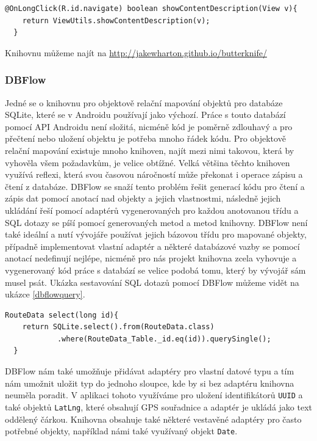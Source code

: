 \documentclass[czech,master,public,dept460,male,java,cpdeclaration]{diploma}
\begin{document}
\begin{lstlisting}[label=butterknife,caption=Použití knihovny Butter Knife]
  @OnLongClick(R.id.navigate) boolean showContentDescription(View v){
    return ViewUtils.showContentDescription(v);
  }

\end{lstlisting}

Knihovnu můžeme najít na \url{http://jakewharton.github.io/butterknife/}

\subsubsection{DBFlow}\label{dbflow}
Jedné se o knihovnu pro objektově relační mapování objektů pro databáze SQLite, které se v
 Androidu používají jako výchozí. Práce s touto databází pomocí API Androidu není
 složitá, nicméně kód je poměrně zdlouhavý a pro přečtení nebo uložení objektu je potřeba
 mnoho řádek kódu. Pro objektově relační mapování existuje mnoho knihoven, najít mezi nimi takovou,
 která by vyhověla všem požadavkům, je velice obtížné. Velká většina těchto knihoven využívá reflexi,
 která svou časovou náročností může překonat i operace zápisu a čtení z databáze.
 DBFlow se snaží tento problém řešit generací kódu pro čtení a zápis dat pomocí anotací nad objekty
 a jejich vlastnostmi, následně jejich ukládání řeší pomocí adaptérů vygenerovaných pro každou anotovanou
 třídu a SQL dotazy se píší pomocí generovaných metod a metod knihovny. DBFlow není také ideální
  a nutí vývojáře používat jejich bázovou třídu pro mapované objekty, případně implementovat vlastní
  adaptér a některé databázové vazby se pomocí anotací nedefinují nejlépe, nicméně pro nás projekt
  knihovna zcela vyhovuje a vygenerovaný kód práce s databází se velice podobá tomu, který by vývojář
  sám musel psát. Ukázka sestavování SQL dotazů pomocí DBFlow můžeme vidět na ukázce \ref{dbflowquery}.

\begin{lstlisting}[label=dbflowquery,caption=Sestavování SQL dotazů s DBFlow]
  RouteData select(long id){
    return SQLite.select().from(RouteData.class)
            .where(RouteData_Table._id.eq(id)).querySingle();
  }
\end{lstlisting}

  DBFlow nám také umožňuje přidávat adaptéry pro vlastní datové typu a tím nám umožnit uložit
  typ do jednoho sloupce, kde by si bez adaptéru knihovna neuměla poradit. V aplikaci
  tohoto využíváme pro uložení identifikátorů \texttt{UUID} a také objektů \texttt{LatLng},
  které obsahují GPS souřadnice a adaptér je ukládá jako text oddělený čárkou.
  Knihovna obsahuje také některé vestavěné adaptéry pro často potřebné objekty, například námi
  také využívaný objekt \texttt{Date}.
\end{document}
